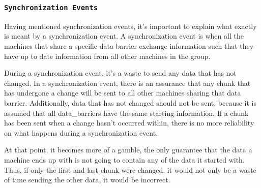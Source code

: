 \documentclass[thesis.tex]{subfiles}
\begin{document}

  \subsubsection{\texttt{Synchronization Events}} %
  \label{ssub:synchronization_events}
    
    Having mentioned synchronization events, it's important to explain what exactly is meant by a synchronization event. A synchronization event is when all the machines that share a specific data barrier exchange information such that they have up to date information from all other machines in the group.
    
    During a synchronization event, it's a waste to send any data that has not changed. In a synchronization event, there is an assurance that any chunk that has undergone a change will be sent to all other machines sharing that data barrier. Additionally, data that has not changed should not be sent, because it is assumed that all data\_barriers have the same starting information. If a chunk has been sent when a change hasn't occurred within, there is no more reliability on what happens during a synchronization event.

    At that point, it becomes more of a gamble, the only guarantee that the data a machine ends up with is not going to contain any of the data it started with. Thus, if only the first and last chunk were changed, it would not only be a waste of time sending the other data, it would be incorrect.
\end{document}

